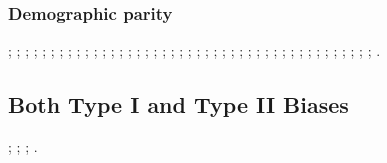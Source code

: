 \subsubsection{Demographic parity} 
\cite{DP_FFVAE};
\cite{fairgan};
\cite{decaf};
\cite{CFQP};
\cite{Fair-Greedy};
\cite{EXP_ELIM};
\cite{OTF};
\cite{Dynamic_programming_fair};
\cite{Disparate_treatment};
\cite{FRAUD-Detect};
\cite{R2B};
\cite{DP_postprocessing};
\cite{minimax_fairness};
\cite{fare};
\cite{fairGBM};
\cite{UDDIA};
\cite{Shifty};
\cite{sufficiency_rule};
\cite{auditing};
\cite{RTO};
\cite{structured_prediction};
\cite{Wasserstein_Barycenters};
\cite{MMD_sinkhorn_divergence};
\cite{FR_Train};
\cite{gordaliza2019obtaining};
\cite{zhao2022inherent};
\cite{locatello2019fairness};
\cite{cunningham2021underestimation};
\cite{fairness_constraints};
\cite{yang2023fairness};
\cite{chen2023personalized};
\cite{rateike2022don};
\cite{ghazimatin2022measuring};
\cite{zhang2021towards};
\cite{jin2024maximal};
\cite{xiong2023fair};
\cite{ohayon2024perceptual};
\cite{defrance2024abcfair};
\cite{NEURIPS2024_142bff4f};
\cite{dehdashtian2024fairerclip};
\cite{liu2024towards};
\cite{kang2024deceptive};
\cite{cachel2024prefair};
\cite{difference_ratio}.

















\subsection{Both Type I and Type II Biases}
\cite{DB_VAE_algorithmic_bias};
\cite{BR_Net_dataset_vs_task};
\cite{minority_group_vs_sensitive_attribute};
\cite{spurious_correlation_Underrepresentation}.

